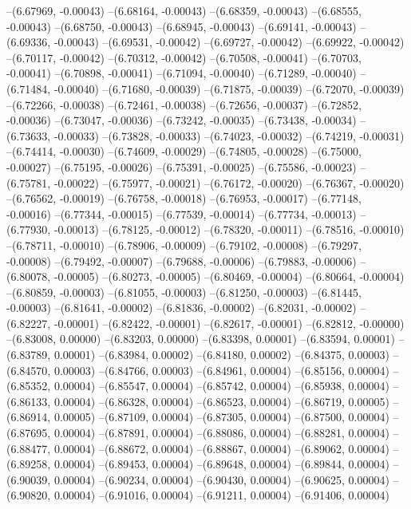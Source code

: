 --(6.67969, -0.00043)
--(6.68164, -0.00043)
--(6.68359, -0.00043)
--(6.68555, -0.00043)
--(6.68750, -0.00043)
--(6.68945, -0.00043)
--(6.69141, -0.00043)
--(6.69336, -0.00043)
--(6.69531, -0.00042)
--(6.69727, -0.00042)
--(6.69922, -0.00042)
--(6.70117, -0.00042)
--(6.70312, -0.00042)
--(6.70508, -0.00041)
--(6.70703, -0.00041)
--(6.70898, -0.00041)
--(6.71094, -0.00040)
--(6.71289, -0.00040)
--(6.71484, -0.00040)
--(6.71680, -0.00039)
--(6.71875, -0.00039)
--(6.72070, -0.00039)
--(6.72266, -0.00038)
--(6.72461, -0.00038)
--(6.72656, -0.00037)
--(6.72852, -0.00036)
--(6.73047, -0.00036)
--(6.73242, -0.00035)
--(6.73438, -0.00034)
--(6.73633, -0.00033)
--(6.73828, -0.00033)
--(6.74023, -0.00032)
--(6.74219, -0.00031)
--(6.74414, -0.00030)
--(6.74609, -0.00029)
--(6.74805, -0.00028)
--(6.75000, -0.00027)
--(6.75195, -0.00026)
--(6.75391, -0.00025)
--(6.75586, -0.00023)
--(6.75781, -0.00022)
--(6.75977, -0.00021)
--(6.76172, -0.00020)
--(6.76367, -0.00020)
--(6.76562, -0.00019)
--(6.76758, -0.00018)
--(6.76953, -0.00017)
--(6.77148, -0.00016)
--(6.77344, -0.00015)
--(6.77539, -0.00014)
--(6.77734, -0.00013)
--(6.77930, -0.00013)
--(6.78125, -0.00012)
--(6.78320, -0.00011)
--(6.78516, -0.00010)
--(6.78711, -0.00010)
--(6.78906, -0.00009)
--(6.79102, -0.00008)
--(6.79297, -0.00008)
--(6.79492, -0.00007)
--(6.79688, -0.00006)
--(6.79883, -0.00006)
--(6.80078, -0.00005)
--(6.80273, -0.00005)
--(6.80469, -0.00004)
--(6.80664, -0.00004)
--(6.80859, -0.00003)
--(6.81055, -0.00003)
--(6.81250, -0.00003)
--(6.81445, -0.00003)
--(6.81641, -0.00002)
--(6.81836, -0.00002)
--(6.82031, -0.00002)
--(6.82227, -0.00001)
--(6.82422, -0.00001)
--(6.82617, -0.00001)
--(6.82812, -0.00000)
--(6.83008, 0.00000)
--(6.83203, 0.00000)
--(6.83398, 0.00001)
--(6.83594, 0.00001)
--(6.83789, 0.00001)
--(6.83984, 0.00002)
--(6.84180, 0.00002)
--(6.84375, 0.00003)
--(6.84570, 0.00003)
--(6.84766, 0.00003)
--(6.84961, 0.00004)
--(6.85156, 0.00004)
--(6.85352, 0.00004)
--(6.85547, 0.00004)
--(6.85742, 0.00004)
--(6.85938, 0.00004)
--(6.86133, 0.00004)
--(6.86328, 0.00004)
--(6.86523, 0.00004)
--(6.86719, 0.00005)
--(6.86914, 0.00005)
--(6.87109, 0.00004)
--(6.87305, 0.00004)
--(6.87500, 0.00004)
--(6.87695, 0.00004)
--(6.87891, 0.00004)
--(6.88086, 0.00004)
--(6.88281, 0.00004)
--(6.88477, 0.00004)
--(6.88672, 0.00004)
--(6.88867, 0.00004)
--(6.89062, 0.00004)
--(6.89258, 0.00004)
--(6.89453, 0.00004)
--(6.89648, 0.00004)
--(6.89844, 0.00004)
--(6.90039, 0.00004)
--(6.90234, 0.00004)
--(6.90430, 0.00004)
--(6.90625, 0.00004)
--(6.90820, 0.00004)
--(6.91016, 0.00004)
--(6.91211, 0.00004)
--(6.91406, 0.00004)

